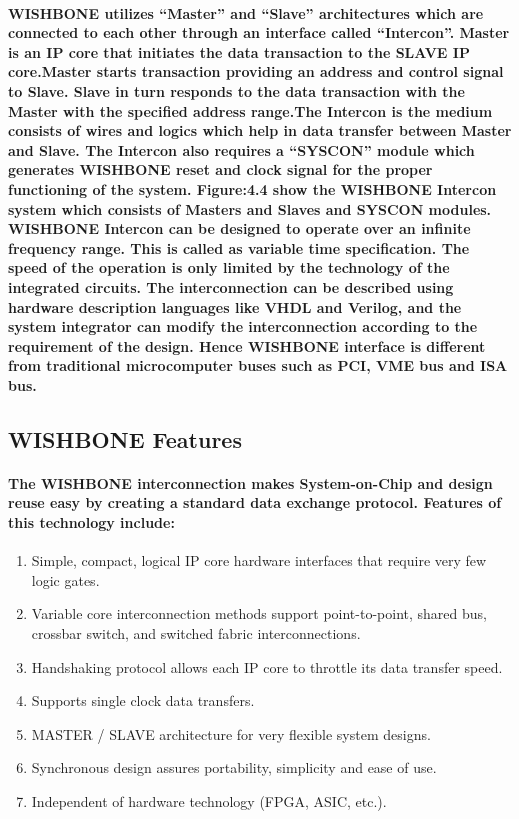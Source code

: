 \documentclass[12pt,a4paper]{report}
\begin{document}
\paragraph{\textrm{\textmd{WISHBONE utilizes “Master” and “Slave” architectures which are connected to
			each other through an interface called “Intercon”. Master is an IP core that initiates the
			data transaction to the SLAVE IP core.Master starts transaction providing an address and control signal to Slave. Slave
			in turn responds to the data transaction with the Master with the specified address range.The Intercon is the medium consists of wires and logics which help in data transfer
			between Master and Slave. The Intercon also requires a “SYSCON” module which
			generates WISHBONE reset and clock signal for the proper functioning of the system.
			Figure:4.4 show the WISHBONE Intercon system which consists of Masters and Slaves
			and SYSCON modules. WISHBONE Intercon can be designed to operate over an infinite
			frequency range. This is called as variable time specification. The speed of the operation
			is only limited by the technology of the integrated circuits. The interconnection can be
			described using hardware description languages like VHDL and Verilog, and the
			system integrator can modify the interconnection according to the requirement of the
			design. Hence WISHBONE interface is different from traditional microcomputer buses
			such as PCI, VME bus and ISA bus. }}}
\subsection{WISHBONE Features }
\paragraph{\textrm{\textmd{The WISHBONE interconnection makes System-on-Chip and design reuse easy by creating a
			standard data exchange protocol. Features of this technology include: }}}
\begin{enumerate}
	\item Simple, compact, logical IP core hardware interfaces that require very few logic gates. 
	\item Variable core interconnection methods support point-to-point, shared bus, crossbar
	switch, and switched fabric interconnections. 
	\item Handshaking protocol allows each IP core to throttle its data transfer speed.
	\item Supports single clock data transfers. 
		\item MASTER / SLAVE architecture for very flexible system designs. 
	 	\item Synchronous design assures portability, simplicity and ease of use. 
	 	\item Independent of hardware technology (FPGA, ASIC, etc.). 
\end{enumerate}
\end{document}
